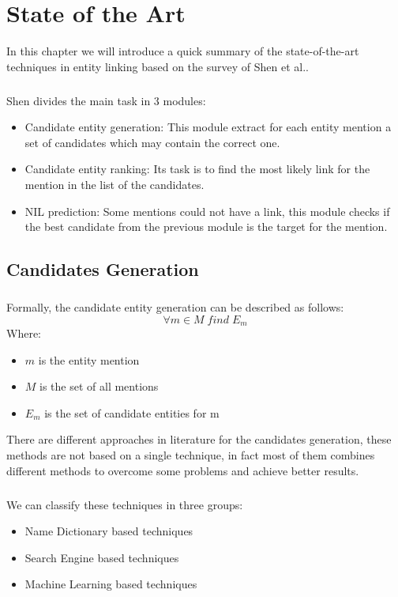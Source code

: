 \chapter{State of the Art}
In this chapter we will introduce a quick summary of the state-of-the-art techniques in entity linking based on the survey of Shen et al.\cite{shen2015entity}.
\paragraph{}
Shen divides the main task in 3 modules:
\begin{itemize}
\item Candidate entity generation: This module extract for each entity mention a set of candidates which may contain the correct one.
\item Candidate entity ranking: Its task is to find the most likely link for the mention in the list of the candidates.
\item NIL prediction: Some mentions could not have a link, this module checks if the best candidate from the previous module is the target for the mention. 
\end{itemize}

\section{Candidates Generation}
\paragraph{}
Formally, the candidate entity generation can be described as follows:
\[\forall m \in M \; find \; E_m\]
Where:

\begin{itemize}[noitemsep,  topsep=10pt]
\item $m$ is the entity mention
\item $M$ is the set of all mentions
\item $E_m$ is the set of candidate entities for m
\end{itemize}

There are different approaches in literature for the candidates generation, these methods are not based on a single technique, in fact most of them combines different methods to overcome some problems and achieve better results.

\paragraph{}
We can classify these techniques in three groups:
\begin{itemize}[noitemsep,  topsep=10pt]
\item Name Dictionary based techniques
\item Search Engine based techniques
\item Machine Learning based techniques
\end{itemize}


